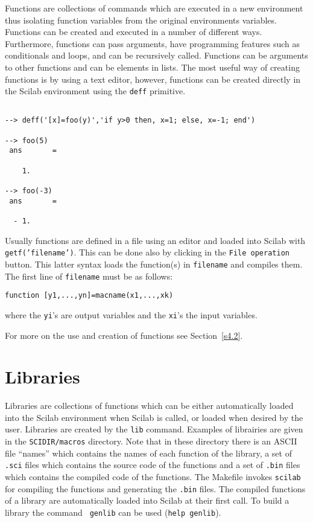  Functions are collections of commands which are executed in a
new environment thus isolating function variables from the original
environments variables.  Functions
can be created and executed in a number of different ways.
Furthermore, functions can pass arguments, have programming features
such as conditionals and loops, and can be recursively called.
Functions can be arguments
to other functions and can be elements in lists.  The most useful
way of creating functions is by using a text editor, however, functions
can be created directly in the Scilab environment using the 
{\tt deff} primitive.
\begin{verbatim}
 
--> deff('[x]=foo(y)','if y>0 then, x=1; else, x=-1; end')
 
--> foo(5)
 ans       =
 
    1.  
 
--> foo(-3)
 ans       =
 
  - 1.  
\end{verbatim}
Usually functions are defined in a file using an editor and loaded
into Scilab with {\tt getf('filename')}.
This can be done also by clicking in the {\tt File operation} button.
This latter syntax loads the function(s) in {\tt filename} and compiles
them.
The first line of {\tt filename} must be as follows:
\begin{verbatim}
function [y1,...,yn]=macname(x1,...,xk)
\end{verbatim}
where the {\tt yi}'s are output variables and the {\tt xi}'s the
input variables.

For more on the use and creation of functions see Section~\ref{s4.2}.

\section{Libraries}
\label{s2.7}

	Libraries are collections of functions which can be either 
automatically loaded into the Scilab environment when
Scilab is called, or loaded when desired by the user.  
Libraries are created by the {\tt lib} command. Examples of librairies
are given in the {\tt SCIDIR/macros} directory. Note that in these
directory there is an ASCII file ``names'' which contains the names
of each function of the library, a set of {\tt .sci} files which
contains the source code of the functions and a set of {\tt .bin} files
which contains the compiled code of the functions. The Makefile invokes
{\tt scilab} for compiling the functions and generating the {\tt .bin}
files. The compiled functions of a library are automatically loaded 
into Scilab at their first call. To build a library the command {\tt
genlib} can be used (\verb!help genlib!).

